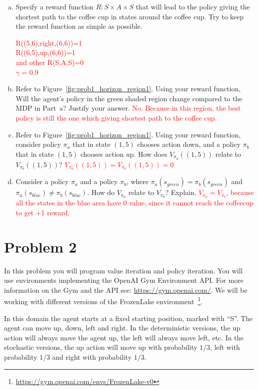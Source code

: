 \documentclass[12pt]{article}
\newcommand{\yl}[1]{\textcolor{red}{#1}}
\begin{document}
\begin{enumerate}[a)]
\item Specify a reward function $R : S \times A \times S$ that will lead to the
  policy giving the shortest path to the coffee cup in states around
  the coffee cup. Try to keep the reward function as simple as possible. 
    
    \yl{R((5,6),right,(6,6))=1\\
  R((6,5),up,(6,6))=1\\
 and other R(S,A,S)=0\\
 $\gamma$ = 0.9}
\item Refer to Figure~\ref{fig:prob1_horizon_region1}. Using your
  reward function, Will the agent's policy in the green shaded region
  change compared to the MDP in Part~a? Justify your answer. \yl{No. Because in this region, the best policy is still the one which giving shortest path to the coffee cup.}
\item Refer to Figure~\ref{fig:prob1_horizon_region1}. Using your
  reward function, consider policy $\pi_a$ that in state $(1,5)$
  chooses action down, and a policy $\pi_b$ that in state
  $(1,5)$ chooses action up. How does $V_{\pi_a} ((1, 5))$ relate to
  $V_{\pi_b}((1,5))$? \yl{$V_{\pi_a} ((1, 5))=V_{\pi_b}((1,5))=0$}
\item Consider a policy $\pi_a$ and a policy $\pi_b$, where
  $\pi_a(s_{green}) = \pi_b(s_{green})$ and
  $\pi_a(s_{blue}) \not= \pi_b(s_{blue})$. How do $V_{\pi_a}$ relate
  to $V_{\pi_b}$? Explain. \yl{$V_{\pi_a}=V_{\pi_b}$, because all the states in the blue area have 0 value, since it cannot reach the coffeecup to get +1 reward.}

\end{enumerate}

\section*{Problem 2}

In this problem you will program value iteration and policy
iteration. You will use environments implementing the OpenAI Gym
Environment API. For more information on the Gym and the API see:
\url{https://gym.openai.com/}. We will be working with different
versions of the FrozenLake
environment~\footnote{\url{https://gym.openai.com/envs/FrozenLake-v0}}.

In this domain the agent starts at a fixed starting position, marked
with ``S''. The agent can move up, down, left and right. In the
deterministic versions, the up action will always move the agent up,
the left will always move left, etc. In the stochastic versions, the
up action will move up with probability $1/3$, left with probability $1/3$
and right with probability $1/3$.
\end{document}
